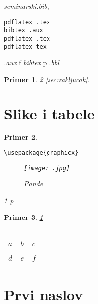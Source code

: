 \documentclass[a4paper]{article}
\newtheorem{primer}{Primer}[section]
\begin{document}
 {\em seminarski.bib},  
\begin{verbatim}
pdflatex .tex 
bibtex .aux 
pdflatex .tex 
pdflatex tex 
\end{verbatim}
 {\em .aux} f {\em bibtex} p {\em .bbl}  


 
\begin{primer}
 \ref{sec:naslov1}  \ref{sec:zakljucak}.
\end{primer}




\section{Slike i tabele}
\label{slike_i_tabele}

 

\begin{primer} 
\begin{verbatim}
\usepackage{graphicx}
\end{verbatim}

\begin{figure}[h!]
\begin{center}
\texttt{[image: .jpg]}
\end{center}
\caption{Pande}
\label{fig:pande}
\end{figure}

 \ref{fig:pande} p
\end{primer}

\begin{primer}  \ref{tab:tabela1} 

\begin{table}[h!]
\begin{center}
\caption{}
\begin{tabular}{|c|l|r|} \hline
& \\ \hline
a &b&c\\ \hline
d &e&f\\ \hline
\end{tabular}
\label{tab:tabela1}
\end{center}
\end{table}

\end{primer}





\section{Prvi naslov}
\label{sec:naslov1}
\end{document}
